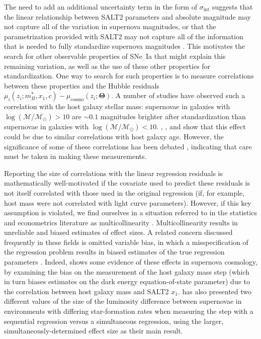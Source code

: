 The need to add an additional uncertainty term in the form of $\sigma_\text{int}$ suggests that the linear relationship between SALT2 parameters and absolute magnitude may not capture all of the variation in supernova magnitudes, or that the parametrization provided with SALT2 may not capture all of the information that is needed to fully standardize supernova magnitudes \citep{saunders_snemo_2018}. This motivates the search for other observable properties of SNe~Ia that might explain this remaining variation, as well as the use of these other properties for standardization. One way to search for such properties is to measure correlations between these properties and the Hubble residuals $\mu_i(z_i;m_B^*, x_1, c)-\mu_\text{cosmo}(z_i;\bm{\Theta})$. A number of studies \citep{kelly_hubble_2010, lampeitl_effect_2010, sullivan_dependence_2010, childress_host_2013} have observed such a correlation with the host galaxy stellar mass: supernovae in galaxies with $\log(\mathcal{M}/\mathcal{M}_\odot) > 10$ are $\sim0.1$ magnitudes brighter after standardization than supernovae in galaxies with $\log(\mathcal{M}/\mathcal{M}_\odot) < 10$. \cite{rigault_evidence_2013}, \cite{childress_ages_2014}, and \cite{rigault_confirmation_2015} show that this effect could be due to similar correlations with host galaxy age. However, the significance of some of these correlations has been debated \citep[e.g.][]{jones_reconsidering_2015, jones_should_2018}, indicating that care must be taken in making these measurements.

Reporting the size of correlations with the linear regression residuals is mathematically well-motivated if the covariate used to predict these residuals is not itself correlated with those used in the original regression (if, for example, host mass were not correlated with light curve parameters). However, if this key assumption is violated, we find ourselves in a situation referred to in the statistics and econometrics literature as multicollinearity \cite[e.g.][]{farrar_multicollinearity_1967}. Multicollinearity results in unreliable and biased estimates of effect sizes.  A related concern discussed frequently  in these fields is omitted variable bias, in which a misspecification of the regression problem results in biased estimates of the true regression parameters \citep{clarke_phantom_2005, wooldridge_introductory_2013}. Indeed, \cite{smith_first_2020} shows some evidence of these effects in supernova cosmology, by  examining the bias on the measurement of the host galaxy mass step (which in turn biases estimates on the dark energy equation-of-state parameter) due to the correlation between host galaxy mass and SALT2 $x_1$. \cite{rigault_strong_2018} has also presented two different values of the size of the luminosity difference between supernovae in environments with differing star-formation rates when measuring the step with a sequential regression versus a simultaneous regression, using the larger, simultaneously-determined effect size as their main result.

